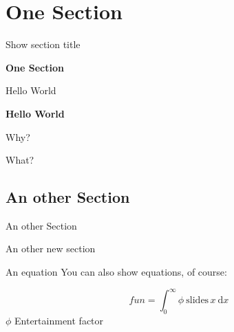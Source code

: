 \documentclass[ucs,10pt]{beamer}
\begin{document}
\section{One Section}
\begin{frame}{Show section title}

	\begin{center}
		{\fontsize{12}{12} \selectfont \textbf{One Section}}
	\end{center}

\end{frame}
\begin{frame}{Hello World}

	\begin{center}
		\textbf{Hello World}
	\end{center}

	\begin{minipage}[b]{.4\linewidth}
		\begin{flushleft}
			Why?
	\end{flushleft}
	\end{minipage}
	\begin{minipage}[b]{.4\linewidth}
		\begin{flushleft}
			\pause What?
		\end{flushleft}
	\end{minipage}

\end{frame}
\subsection{An other Section}
\begin{frame}{An other Section}

	\begin{center}An other new section\end{center}
	
\end{frame}
\begin{frame}{An equation}
You can also show equations, of course:
	
	\[ fun = \int_{0}^{\infty} \phi\ \mathrm{slides}\, x \ \mathrm{d}x \]
	$\phi$ Entertainment factor

\end{frame}
\end{document}
